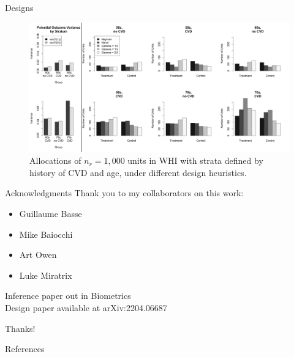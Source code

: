 \documentclass[usenames,dvipsnames]{beamer}
\theoremstyle{definition} %
\begin{document}
\begin{frame}{Designs}
\hspace{-5mm}
\begin{figure}
\centering
\includegraphics[width = 1.05\textwidth]{Allocations.png}
\caption{Allocations of $n_r = 1,000$ units in WHI with strata defined by history of CVD and age, under different design heuristics.}
\end{figure}
\end{frame}



\begin{frame}{Acknowledgments}
Thank you to my collaborators on this work: 
\begin{multicols}{2}
\begin{itemize}
\item Guillaume Basse
\item Mike Baiocchi
\item Art Owen
\item Luke Miratrix 
\end{itemize}
\end{multicols}

\vspace{3mm}

Inference paper out in \color{blue}Biometrics\color{black}\\
Design paper available at \color{blue}arXiv:2204.06687\color{black}
\end{frame}

\begin{frame}{Thanks!}

\end{frame}

\begin{frame}[allowframebreaks]{References}
\tiny
\normalsize
\end{frame}
\end{document}
